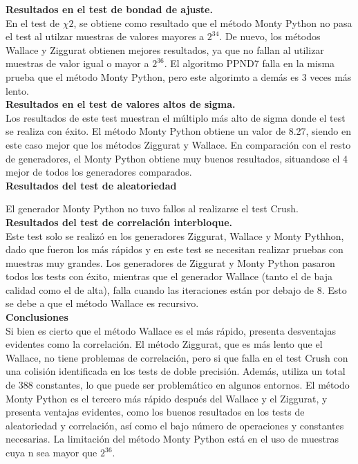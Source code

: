\documentclass[a4paper,12pt]{article}
\begin{document}
	
	
	
	\textbf{Resultados en el test de bondad de ajuste.}\\

	
	En el test de $\chi{2}$, se obtiene como resultado que el método Monty Python no pasa el test al utilzar muestras de valores mayores a $2^{34}$. De nuevo, los métodos Wallace y Ziggurat obtienen mejores resultados, ya que no fallan al utilizar muestras de valor igual o mayor a $2^{36}$. El algoritmo PPND7 falla en la misma prueba que el método Monty Python, pero este algorimto a demás es 3 veces más lento.\\

	
	
	\textbf{Resultados en el test de valores altos de sigma.}\\

	Los resultados de este test muestran el múltiplo más alto de sigma donde el test se realiza con éxito. El método Monty Python obtiene un valor de 8.27, siendo en este caso mejor que los métodos Ziggurat y Wallace. En comparación con el resto de generadores, el Monty Python obtiene muy buenos resultados, situandose el 4 mejor de todos los generadores comparados. \\

	
	\textbf{Resultados del test de aleatoriedad}

	El generador Monty Python no tuvo fallos al realizarse el test Crush. \\

	
	\textbf{Resultados del test de correlación interbloque.}\\

	Este test solo se realizó en los generadores Ziggurat, Wallace y Monty Pythhon, dado que fueron los más rápidos y en este test se necesitan realizar pruebas con muestras muy grandes. Los generadores de Ziggurat y Monty Python pasaron todos los tests con éxito, mientras que el generador Wallace (tanto el de baja calidad como el de alta), falla cuando las iteraciones están por debajo de 8. Esto se debe a que el método Wallace es recursivo.\\

	
	
	\textbf{Conclusiones}\\

	
	Si bien es cierto que el método Wallace es el más rápido, presenta desventajas evidentes como la correlación. 
	El método Ziggurat, que es más lento que el Wallace, no tiene problemas de correlación, pero si que falla en el test Crush con una colisión identificada en los tests de doble precisión. 
	Además, utiliza un total de 388 constantes, lo que puede ser problemático en algunos entornos. 
	El método Monty Python es el tercero más rápido después del Wallace y el Ziggurat, y presenta ventajas evidentes, como los buenos resultados en los tests de aleatoriedad y correlación, así como el bajo número de operaciones y constantes necesarias. 
	La limitación del método Monty Python está en el uso de muestras cuya n sea mayor que  $2^{36}$. 
	
\end{document}
